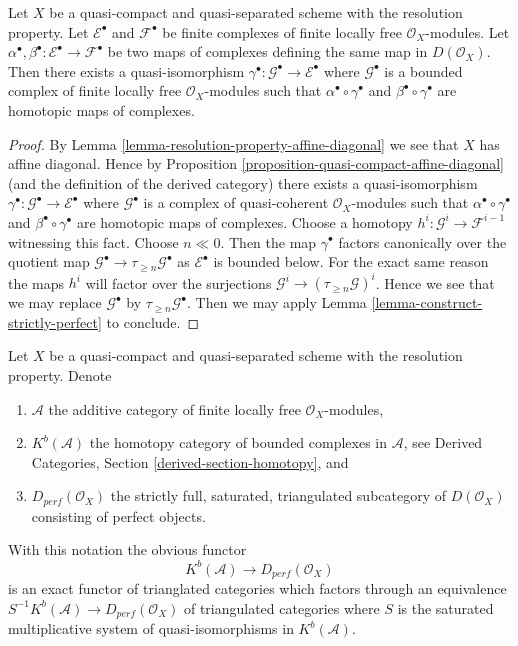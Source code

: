 \begin{lemma}
\label{lemma-resolution-property-homotopy-map-perfect-complex}
Let $X$ be a quasi-compact and quasi-separated scheme with the
resolution property. Let $\mathcal{E}^\bullet$ and $\mathcal{F}^\bullet$
be finite complexes of finite locally free $\mathcal{O}_X$-modules.
Let $\alpha^\bullet, \beta^\bullet :\mathcal{E}^\bullet \to \mathcal{F}^\bullet$
be two maps of complexes defining the same map in $D(\mathcal{O}_X)$.
Then there exists a quasi-isomorphism
$\gamma^\bullet : \mathcal{G}^\bullet \to \mathcal{E}^\bullet$
where $\mathcal{G}^\bullet$ is a bounded complex of finite locally free
$\mathcal{O}_X$-modules
such that $\alpha^\bullet \circ \gamma^\bullet$ and
$\beta^\bullet \circ \gamma^\bullet$ are homotopic maps of complexes.
\end{lemma}

\begin{proof}
By Lemma \ref{lemma-resolution-property-affine-diagonal}
we see that $X$ has affine diagonal. Hence by
Proposition \ref{proposition-quasi-compact-affine-diagonal}
(and the definition of the derived category)
there exists a quasi-isomorphism
$\gamma^\bullet : \mathcal{G}^\bullet \to \mathcal{E}^\bullet$
where $\mathcal{G}^\bullet$ is a complex of quasi-coherent
$\mathcal{O}_X$-modules
such that $\alpha^\bullet \circ \gamma^\bullet$ and
$\beta^\bullet \circ \gamma^\bullet$ are homotopic maps of complexes.
Choose a homotopy $h^i : \mathcal{G}^i \to \mathcal{F}^{i - 1}$
witnessing this fact. Choose $n \ll 0$. Then the map
$\gamma^\bullet$ factors canonically over the quotient
map $\mathcal{G}^\bullet \to \tau_{\geq n}\mathcal{G}^\bullet$
as $\mathcal{E}^\bullet$ is bounded below. For the exact same
reason the maps $h^i$ will factor over the surjections
$\mathcal{G}^i \to (\tau_{\geq n}\mathcal{G})^i$.
Hence we see that we may replace $\mathcal{G}^\bullet$
by $\tau_{\geq n}\mathcal{G}^\bullet$.
Then we may apply Lemma \ref{lemma-construct-strictly-perfect} to conclude.
\end{proof}

\begin{proposition}
\label{proposition-perfect-resolution-property}
Let $X$ be a quasi-compact and quasi-separated scheme with the
resolution property. Denote
\begin{enumerate}
\item $\mathcal{A}$ the additive category of finite locally free
$\mathcal{O}_X$-modules,
\item $K^b(\mathcal{A})$ the homotopy category of bounded complexes
in $\mathcal{A}$, see
Derived Categories, Section \ref{derived-section-homotopy}, and
\item $D_{perf}(\mathcal{O}_X)$ the strictly full, saturated,
triangulated subcategory of $D(\mathcal{O}_X)$ consisting of
perfect objects.
\end{enumerate}
With this notation the obvious functor
$$
K^b(\mathcal{A}) \longrightarrow D_{perf}(\mathcal{O}_X)
$$
is an exact functor of trianglated categories which factors through an
equivalence $S^{-1}K^b(\mathcal{A}) \to D_{perf}(\mathcal{O}_X)$
of triangulated categories
where $S$ is the saturated multiplicative system of quasi-isomorphisms
in $K^b(\mathcal{A})$.
\end{proposition}

